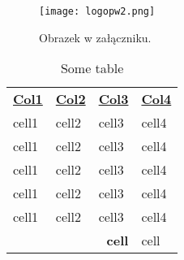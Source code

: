 \clearpage
{}
\lipsum[1-3]
\begin{figure}[!h]
	\centering \texttt{[image: logopw2.png]}
	\caption{Obrazek w załączniku.}
\end{figure}
\lipsum[4-7]

\clearpage
{}
\lipsum[1-2]
\begin{table}[H] \centering
    \caption{Some table}
    \label{tab:cellll}
    \begin{tabular}{l l l l}
        \toprule[2pt]
        \textbf{\uline{Col1}}     &  \textbf{\uline{Col2}}&   \textbf{\uline{Col3}} &  \textbf{\uline{Col4}} \\
        cell1                      & cell2                     & cell3              & cell4                  \\  
        cell1                      & cell2                     & cell3              & cell4                  \\  
        cell1                      & cell2                     & cell3              & cell4                  \\  
        cell1                      & cell2                     & cell3              & cell4                  \\  
        cell1                      & cell2                     & cell3              & cell4                  \\  
        \midrule \multicolumn{3}{r}{\textbf{cell}} & cell \\
        \bottomrule[2pt]
    \end{tabular}
\end{table}
\lipsum[3-4]